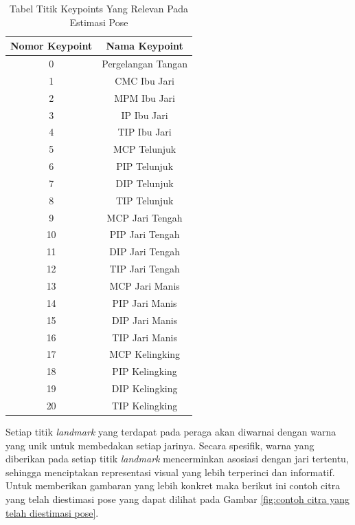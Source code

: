 \begin{table}[h]
  \caption{Tabel Titik Keypoints Yang Relevan Pada Estimasi Pose\cite{Developer_2023z}}
  \label{tbl:titik keypoints}
  \centering
  \begin{tabular}{|c|c|}
    \hline
    Nomor Keypoint & Nama Keypoint      \\ \hline
    0              & Pergelangan Tangan \\ \hline
    1              & CMC Ibu Jari       \\ \hline
    2              & MPM Ibu Jari       \\ \hline
    3              & IP Ibu Jari        \\ \hline
    4              & TIP Ibu Jari       \\ \hline
    5              & MCP Telunjuk       \\ \hline
    6              & PIP Telunjuk       \\ \hline
    7              & DIP Telunjuk       \\ \hline
    8              & TIP Telunjuk       \\ \hline
    9              & MCP Jari Tengah    \\ \hline
    10             & PIP Jari Tengah    \\ \hline
    11             & DIP Jari Tengah    \\ \hline
    12             & TIP Jari Tengah    \\ \hline
    13             & MCP Jari Manis     \\ \hline
    14             & PIP Jari Manis     \\ \hline
    15             & DIP Jari Manis     \\ \hline
    16             & TIP Jari Manis     \\ \hline
    17             & MCP Kelingking     \\ \hline
    18             & PIP Kelingking     \\ \hline
    19             & DIP Kelingking     \\ \hline
    20             & TIP Kelingking     \\ \hline
  \end{tabular}
\end{table}

Setiap titik \emph{landmark} yang terdapat pada peraga akan diwarnai dengan warna yang unik untuk membedakan setiap jarinya. Secara spesifik, warna yang diberikan pada setiap titik \emph{landmark} mencerminkan asosiasi dengan jari tertentu, sehingga menciptakan representasi visual yang lebih terperinci dan informatif. Untuk memberikan gambaran yang lebih konkret maka berikut ini contoh citra yang telah diestimasi pose yang dapat dilihat pada Gambar \ref{fig:contoh citra yang telah diestimasi pose}.

